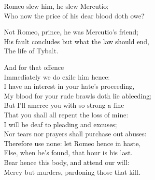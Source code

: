 \begin{speech}
Romeo slew him, he slew Mercutio; \\
Who now the price of his dear blood doth owe? \\
\end{speech}
\begin{speech}
Not Romeo, prince, he was Mercutio's friend; \\
His fault concludes but what the law should end, \\
The life of Tybalt. \\
\end{speech}
\begin{speech}
And for that offence \\
Immediately we do exile him hence: \\
I have an interest in your hate's proceeding, \\
My blood for your rude brawls doth lie ableeding; \\
But I'll amerce you with so strong a fine \\
That you shall all repent the loss of mine: \\
I will be deaf to pleading and excuses; \\
Nor tears nor prayers shall purchase out abuses: \\
Therefore use none: let Romeo hence in haste, \\
Else, when he's found, that hour is his last. \\
Bear hence this body, and attend our will: \\
Mercy but murders, pardoning those that kill. 
\\
\end{speech}


